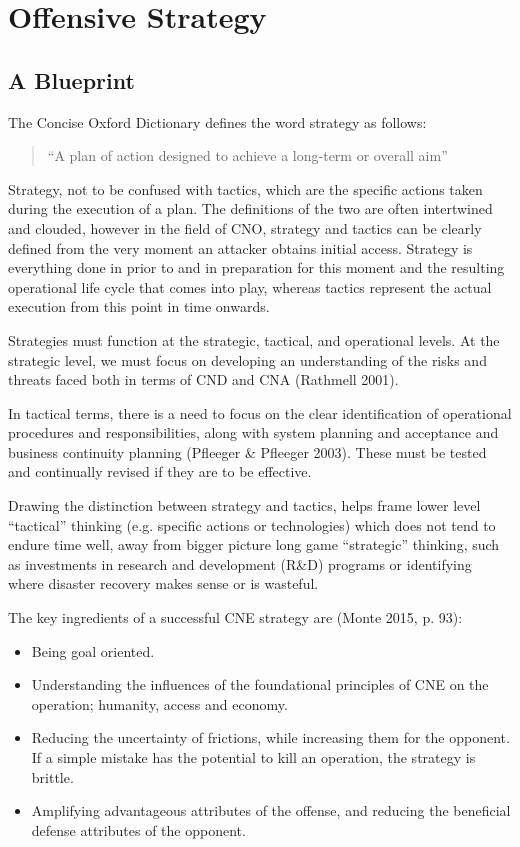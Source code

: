 \documentclass[11pt]{report}
\begin{document}
\chapter{Offensive Strategy}

\section{A Blueprint}

The Concise Oxford Dictionary defines the word strategy as follows: \begin{quote}``A plan of action designed to achieve a long-term or overall aim''\end{quote}

Strategy, not to be confused with tactics, which are the specific actions taken during the execution of a plan. The definitions of the two are often intertwined and clouded, however in the field of CNO, strategy and tactics can be clearly defined from the very moment an attacker obtains initial access. Strategy is everything done in prior to and in preparation for this moment and the resulting operational life cycle that comes into play, whereas tactics represent the actual execution from this point in time onwards.

Strategies must function at the strategic, tactical, and operational levels. At the strategic level, we must focus on developing an understanding of the risks and threats faced both in terms of CND and CNA (Rathmell 2001).

In tactical terms, there is a need to focus on the clear identification of operational procedures and responsibilities, along with system planning and acceptance and business continuity planning (Pfleeger \& Pfleeger 2003). These must be tested and continually revised if they are to be effective.

Drawing the distinction between strategy and tactics, helps frame lower level “tactical” thinking (e.g. specific actions or technologies) which does not tend to endure time well, away from bigger picture long game “strategic” thinking, such as investments in research and development (R\&D) programs or identifying where disaster recovery makes sense or is wasteful.

The key ingredients of a successful CNE strategy are (Monte 2015, p. 93):


\begin{itemize}
	\item Being goal oriented.
	\item Understanding the influences of the foundational principles of CNE on the  operation; humanity, access and economy.
	\item Reducing the uncertainty of frictions, while increasing them for the opponent. If a simple mistake has the potential to kill an operation, the strategy is brittle.
	\item Amplifying advantageous attributes of the offense, and reducing the beneficial defense  attributes of the opponent.
\end{itemize}
\end{document}
